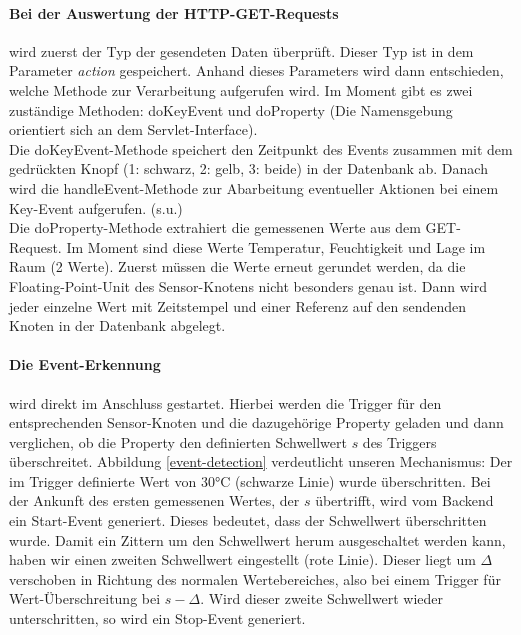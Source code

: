 \documentclass[12pt,a4paper,twoside]{article}
\begin{document}
\paragraph{Bei der Auswertung der HTTP-GET-Requests} wird zuerst der Typ der gesendeten Daten überprüft. Dieser Typ ist in dem Parameter \textit{action} gespeichert. Anhand dieses Parameters wird dann entschieden, welche Methode zur Verarbeitung aufgerufen wird. Im Moment gibt es zwei zuständige Methoden: doKeyEvent und doProperty (Die Namensgebung orientiert sich an dem Servlet-Interface).\\
Die doKeyEvent-Methode speichert den Zeitpunkt des Events zusammen mit dem gedrückten Knopf (1: schwarz, 2: gelb, 3: beide) in der Datenbank ab. Danach wird die handleEvent-Methode zur Abarbeitung eventueller Aktionen bei einem Key-Event aufgerufen. (s.u.)\\
Die doProperty-Methode extrahiert die gemessenen Werte aus dem GET-Request. Im Moment sind diese Werte Temperatur, Feuchtigkeit und Lage im Raum (2 Werte). Zuerst müssen die Werte erneut gerundet werden, da die Floating-Point-Unit des Sensor-Knotens nicht besonders genau ist. Dann wird jeder einzelne Wert mit Zeitstempel und einer Referenz auf den sendenden Knoten in der Datenbank abgelegt. 

\paragraph{Die Event-Erkennung} wird direkt im Anschluss gestartet. Hierbei werden die Trigger für den entsprechenden Sensor-Knoten und die dazugehörige Property geladen und dann verglichen, ob die Property den definierten Schwellwert $s$ des Triggers überschreitet. Abbildung \ref{event-detection} verdeutlicht unseren Mechanismus: Der im Trigger definierte Wert von 30°C (schwarze Linie) wurde überschritten. Bei der Ankunft des ersten gemessenen Wertes, der $s$ übertrifft, wird vom Backend ein Start-Event generiert. Dieses bedeutet, dass der Schwellwert überschritten wurde. Damit ein Zittern um den Schwellwert herum ausgeschaltet werden kann, haben wir einen zweiten Schwellwert eingestellt (rote Linie). Dieser liegt um $\Delta$ verschoben in Richtung des normalen Wertebereiches, also bei einem Trigger für Wert-Überschreitung bei $s - \Delta$.
Wird dieser zweite Schwellwert wieder unterschritten, so wird ein Stop-Event generiert. 
\end{document}
